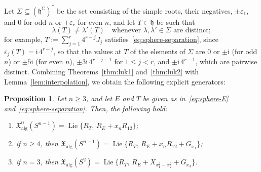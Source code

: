 \documentclass{article}
\newcommand{\C}{\mathbb{C}}
\newcommand{\frakh}{\mathfrak{h}}
\newcommand{\xalg}{\mathfrak X_{\mathrm{alg}}}
\newcommand{\xalgz}{\mathfrak X^{0}_{\mathrm{alg}}}
\newtheorem{proposition}[theorem]{Proposition}
\theoremstyle{definition}
\theoremstyle{plain}
\begin{document}
Let $\Sigma\subseteq(\frakh^\C)^*$ be the set consisting of the simple roots, their negatives, $\pm\varepsilon_1$, and $0$ for odd $n$ or $\pm\varepsilon_r$ for even $n$, and let $T\in\frakh$ be such that
\begin{equation}\label{eq:sphere-separation}
\lambda(T)\neq\lambda'(T)\quad\mbox{whenever }\lambda,\lambda'\in\Sigma\mbox{ are distinct};
\end{equation}
for example, $T:=\sum_{j=1}^r4^{r-j}J_j$ satisfies~\eqref{eq:sphere-separation}, since $\varepsilon_j(T)=\mathrm{i}\,4^{r-j}$, so that the values at $T$ of the elements of $\Sigma$ are $0$ or $\pm\mathrm{i}$ (for odd $n$) or $\pm5\mathrm{i}$ (for even $n$), $\pm3\mathrm{i}\,4^{r-j-1}$ for $1\leq j<r$, and $\pm\mathrm{i}\,4^{r-1}$, which are pairwise distinct.
 Combining Theorems~\ref{thm:luk1} and~\ref{thm:luk2} with Lemma~\ref{lem:interpolation}, we obtain the following explicit generators:


\begin{proposition}\label{prop:sphere-pairs}
Let $n\geq3$, and let $E$ and $T$ be given as in~\eqref{eq:sphere-E} and~\eqref{eq:sphere-separation}. Then, the following hold:
\begin{enumerate}
\item $\xalgz(S^{n-1})=\operatorname{Lie}\{R_T,\,R_E+x_nR_{12}\}$;
\item if $n\geq4$, then $\xalg(S^{n-1})=\operatorname{Lie}\{R_T,\,R_E+x_nR_{12}+G_{x_1}\}$;
	\item if $n=3$, then $\xalg(S^2)=\operatorname{Lie}\{R_T,\,R_E+X_{x_1^2-x_2^2}+G_{x_3}\}$.
\end{enumerate}
\end{proposition}
\end{document}
